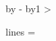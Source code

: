 
\newdimen\myheight \myheight\vsize

\newcount\linecount {}
\loop
  \advance\myheight by -\baselineskip 
  \advance\linecount by1
\ifnum\myheight>\baselineskip\repeat

lines = \the\linecount

\bye
